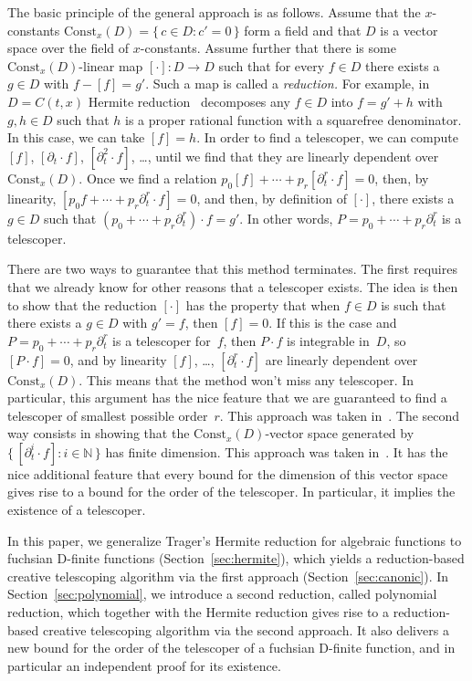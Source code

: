 \documentclass{sig-alternate}
\let\set\mathbb
\begin{document}
The basic principle of the general approach is as follows. Assume that the
$x$-constants $\mathrm{Const}_x(D)=\{\,c\in D:c'=0\,\}$ form a field and that $D$
is a vector space over the field of $x$-constants. Assume further that there is
some $\mathrm{Const}_x(D)$-linear map $[\cdot]\colon D\to D$ such that for every
$f\in D$ there exists a $g\in D$ with $f-[f]=g'$. Such a map is called a
\emph{reduction.} For example, in $D=C(t,x)$ Hermite reduction~\cite{Hermite1872} decomposes
any $f\in D$ into $f=g'+h$ with $g,h\in D$ such that $h$ is a proper rational function
with a squarefree denominator. In this case, we can take $[f]=h$.
In order to find a telescoper, we can compute $[f]$, $[\partial_t\cdot f]$, $[\partial_t^2\cdot f]$, \dots,
until we find that they are linearly dependent over $\mathrm{Const}_x(D)$.
Once we find a relation
$p_0[f] + \cdots + p_r[\partial_t^r\cdot f] = 0$,
then, by linearity,
$[p_0 f + \cdots + p_r \partial_t^r\cdot f] = 0$,
and then, by definition of $[\cdot]$, there exists a $g\in D$ such that $(p_0+\cdots + p_r\partial_t^r)\cdot f=g'$.
In other words, $P=p_0+\cdots + p_r\partial_t^r$ is a telescoper.

There are two ways to guarantee that this method terminates. The first
requires that we already know for other reasons that a telescoper exists. The
idea is then to show that the reduction $[\cdot]$ has the property that when
$f\in D$ is such that there exists a $g\in D$ with $g'=f$, then $[f]=0$. If
this is the case and $P=p_0+\cdots+p_r\partial_t^r$ is a telescoper for~$f$,
then $P\cdot f$ is integrable in~$D$, so $[P\cdot f]=0$, and by linearity
$[f]$, \dots, $[\partial_t^r\cdot f]$ are linearly dependent over
$\mathrm{Const}_x(D)$. This means that the method won't miss any
telescoper. In particular, this argument has the nice feature that we are
guaranteed to find a telescoper of smallest possible order~$r$. This approach
was taken in~\cite{chen15a}. The second way consists in showing that the
$\mathrm{Const}_x(D)$-vector space generated by $\{\,[\partial_t^i\cdot
  f]:i\in\set N\,\}$ has finite dimension. This approach was taken
in~\cite{BCCL2010,bostan13a}. It has the nice additional feature that every
bound for the dimension of this vector space gives rise to a bound for the
order of the telescoper. In particular, it implies the existence of a
telescoper.

In this paper, we generalize Trager's Hermite reduction for algebraic
functions to fuchsian D-finite functions (Section~\ref{sec:hermite}), which
yields a reduction-based creative telescoping algorithm via the first approach
(Section~\ref{sec:canonic}). In Section~\ref{sec:polynomial}, we introduce a
second reduction, called polynomial reduction, which together with the Hermite
reduction gives rise to a reduction-based creative telescoping algorithm via
the second approach.  It also delivers a new bound for the order of the
telescoper of a fuchsian D-finite function, and in particular an independent
proof for its existence.
\end{document}
